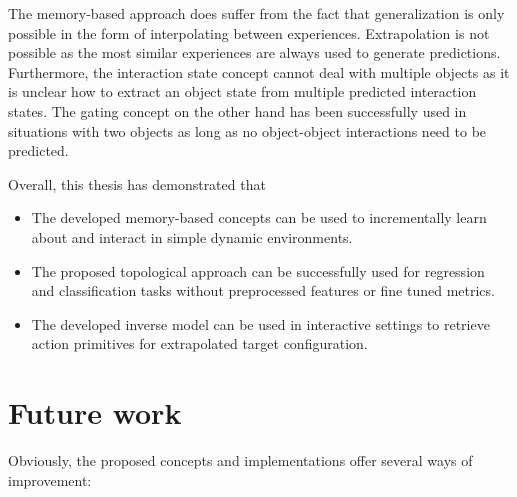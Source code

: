 The memory-based approach does suffer from the fact that generalization is only possible in the form of interpolating between experiences. Extrapolation is not possible as the most similar experiences are always used to generate predictions.
Furthermore, the interaction state concept cannot deal with multiple objects as it is unclear how to extract an object state from multiple predicted interaction states.
The gating concept on the other hand has been successfully used in situations with two objects as long as no object-object interactions need to be predicted.

Overall, this thesis has demonstrated that 

\begin{itemize}
\item The developed memory-based concepts can be used to incrementally learn about and interact in simple dynamic environments. 
\item The proposed topological approach can be successfully used for regression and classification tasks without preprocessed features or fine tuned metrics.
\item The developed inverse model can be used in interactive settings to retrieve action primitives for extrapolated target configuration.
\end{itemize} 


\section{Future work}

Obviously, the proposed concepts and implementations offer several ways of improvement:

